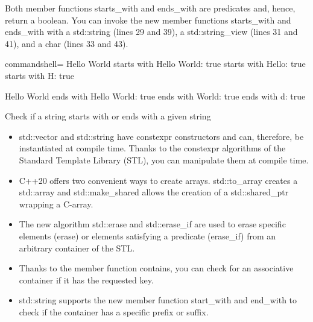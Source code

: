 Both member functions starts\_with and ends\_with are predicates and, hence, return a boolean. You can invoke the new member functions starts\_with and ends\_with with a std::string (lines 29 and 39), a std::string\_view (lines 31 and 41), and a char (lines 33 and 43).

\begin{tcblisting}{commandshell={}}
Hello World
            starts with Hello World: true
            starts with Hello: true
            starts with H: true
            
Hello World
            ends with Hello World: true
            ends with World: true
            ends with d: true
\end{tcblisting}

\begin{center}
Check if a string starts with or ends with a given string
\end{center}

\begin{tcolorbox}[colback=mygreen!5!white,colframe=mygreen!75!black,title={Distilled Information}]
	
\begin{itemize}
\item 
std::vector and std::string have constexpr constructors and can, therefore, be instantiated at compile time. Thanks to the constexpr algorithms of the Standard Template Library (STL), you can manipulate them at compile time.

\item 
C++20 offers two convenient ways to create arrays. std::to\_array creates a std::array and std::make\_shared allows the creation of a std::shared\_ptr wrapping a C-array.

\item 
The new algorithm std::erase and std::erase\_if are used to erase specific elements (erase) or elements satisfying a predicate (erase\_if) from an arbitrary container of the STL.

\item 
Thanks to the member function contains, you can check for an associative container if it has the requested key.

\item 
std::string supports the new member function start\_with and end\_with to check if the container has a specific prefix or suffix.
\end{itemize}
	
\end{tcolorbox}





















